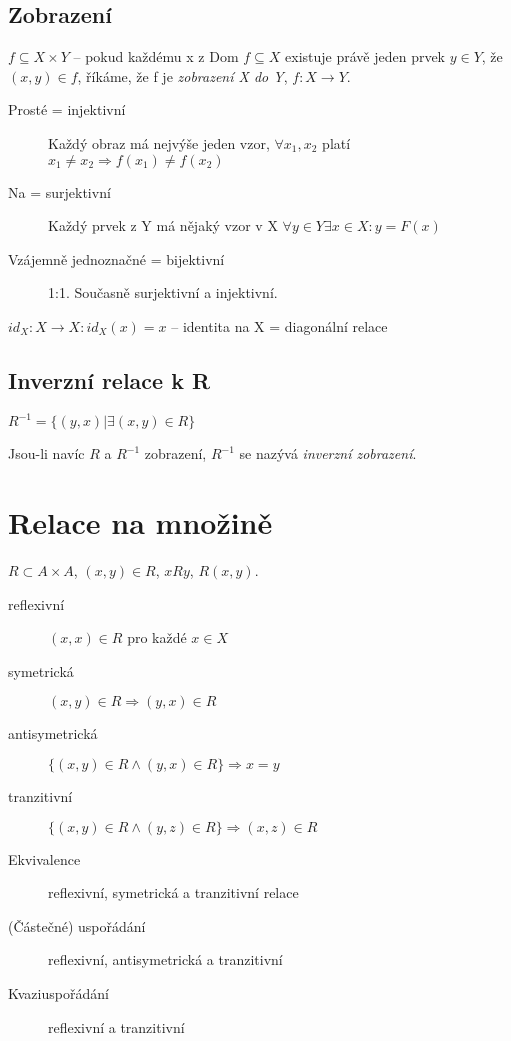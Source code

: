 \documentclass[a4wide]{report}
\begin{document}
\subsection{Zobrazení}
$f \subseteq X \times Y$ -- pokud každému x z Dom $f \subseteq X$ existuje právě jeden prvek $y \in Y$, že $(x,y) \in f$, říkáme, že f je \emph{zobrazení X do Y}, $f: X \to Y$.

\begin{description}
	\item[Prosté = injektivní] Každý obraz má nejvýše jeden vzor, $\forall x_1, x_2$ platí $x_1 \neq x_2 \Rightarrow f(x_1) \neq f(x_2)$ 
	\item[Na = surjektivní] Každý prvek z Y má nějaký vzor v X $\forall y \in Y \exists x \in X: y = F(x)$
	\item[Vzájemně jednoznačné = bijektivní] 1:1. Současně surjektivní a injektivní.
\end{description}

$id_X: X \to X: id_X(x) = x$ -- identita na X = diagonální relace

\subsection{Inverzní relace k R}

$R^{-1} = \{ (y,x) | \exists (x,y) \in R\}$

Jsou-li navíc $R$ a $R^{-1}$ zobrazení, $R^{-1}$ se nazývá \emph{inverzní zobrazení}.

\section{Relace na množině}

$R \subset A \times A$, $(x,y) \in R$, $xRy$, $R(x,y)$.

\begin{description}
	\item[reflexivní] $(x,x) \in R$ pro každé $x \in X$
	\item[symetrická] $(x,y) \in R \Rightarrow (y,x) \in R$
	\item[antisymetrická] $\{(x,y) \in R \land (y,x) \in R\} \Rightarrow x = y$
	\item[tranzitivní] $\{(x,y) \in R \land (y,z) \in R\} \Rightarrow (x,z) \in R$
\end{description}

\begin{description}
	\item[Ekvivalence] reflexivní, symetrická a tranzitivní relace
	\item[(Částečné) uspořádání] reflexivní, antisymetrická a tranzitivní
	\item[Kvaziuspořádání] reflexivní a tranzitivní
\end{description}
\end{document}
